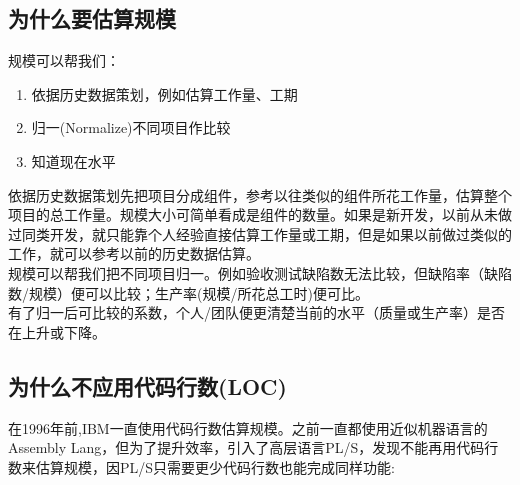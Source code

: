 \documentclass{book}        %
\date{}
\providecommand{\tightlist}{%
  \setlength{\itemsep}{0pt}\setlength{\parskip}{0pt}}
\begin{document}
\hypertarget{ux4e3aux4ec0ux4e48ux8981ux4f30ux7b97ux89c4ux6a21}{%
\subsection{为什么要估算规模}\label{ux4e3aux4ec0ux4e48ux8981ux4f30ux7b97ux89c4ux6a21}}

规模可以帮我们：

\begin{enumerate}
\tightlist
\item
  依据历史数据策划，例如估算工作量、工期
\item
  归一(Normalize)不同项目作比较
\item
  知道现在水平\\
\end{enumerate}

依据历史数据策划先把项目分成组件，参考以往类似的组件所花工作量，估算整个项目的总工作量。规模大小可简单看成是组件的数量。如果是新开发，以前从未做过同类开发，就只能靠个人经验直接估算工作量或工期，但是如果以前做过类似的工作，就可以参考以前的历史数据估算。\\
规模可以帮我们把不同项目归一。例如验收测试缺陷数无法比较，但缺陷率（缺陷数/规模）便可以比较；生产率(规模/所花总工时)便可比。\\
有了归一后可比较的系数，个人/团队便更清楚当前的水平（质量或生产率）是否在上升或下降。

\hypertarget{ux4e3aux4ec0ux4e48ux4e0dux5e94ux7528ux4ee3ux7801ux884cux6570loc}{%
\subsection{为什么不应用代码行数(LOC)}\label{ux4e3aux4ec0ux4e48ux4e0dux5e94ux7528ux4ee3ux7801ux884cux6570loc}}

在1996年前,IBM一直使用代码行数估算规模。之前一直都使用近似机器语言的Assembly
Lang，但为了提升效率，引入了高层语言PL/S，发现不能再用代码行数来估算规模，因PL/S只需要更少代码行数也能完成同样功能:

\end{document}
